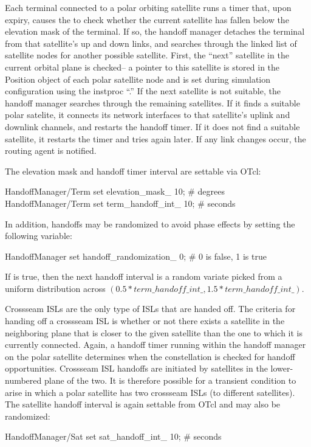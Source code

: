 Each terminal connected to a polar orbiting satellite runs a timer that,
upon expiry, causes the  to check whether the current 
satellite has fallen below the
elevation mask of the terminal.  If so, the handoff manager detaches the
terminal from that satellite's up and down links, and searches
through the linked list of satellite nodes for another possible satellite.
First, the ``next'' satellite in the current orbital plane is checked-- a 
pointer to this satellite is stored in the Position object of each
polar satellite node and is set during simulation configuration using
the  instproc ``.''
If the next satellite is not suitable, the handoff manager searches
through the remaining satellites.  If it finds a suitable polar
satelite, it connects its network interfaces to that satellite's uplink and 
downlink channels, and restarts the handoff timer.  If it does not find 
a suitable
satellite, it restarts the timer and tries again later.  If any link
changes occur, the routing agent is notified.

The elevation mask and handoff timer interval are settable via OTcl: 
\begin{program}
HandoffManager/Term set elevation_mask_ 10; # degrees
HandoffManager/Term set term_handoff_int_ 10; # seconds
\end{program}
In addition, handoffs may be randomized to avoid phase effects by setting
the following variable:
\begin{program}
HandoffManager set handoff_randomization_ 0; # 0 is false, 1 is true 
\end{program}
If  is true, then the next handoff interval
is a random variate picked from a uniform distribution across
$(0.5 * term\_handoff\_int\_, 1.5 * term\_handoff\_int\_)$.  

Crossseam ISLs are the only type of ISLs that are handed off.  The criteria
for handing off a crossseam ISL is whether or not there exists a satellite
in the neighboring plane that is closer to the given satellite than the
one to which it is currently connected.  Again, a handoff timer running
within the handoff manager on the polar satellite determines when the
constellation is checked for handoff opportunities.  Crossseam ISL
handoffs are
initiated by satellites in the lower-numbered plane of the two.  It is
therefore possible for a transient condition to arise in which a polar
satellite has two crossseam ISLs (to different satellites).  The
satellite handoff interval is again settable from OTcl and may also be
randomized:
\begin{program}
HandoffManager/Sat set sat_handoff_int_ 10; # seconds
\end{program}

